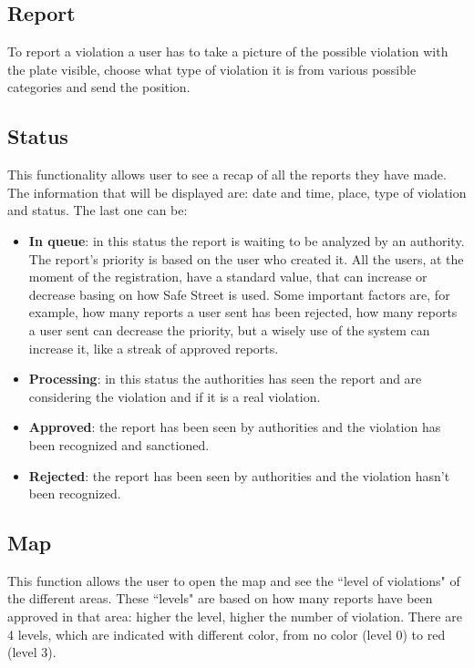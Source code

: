 \documentclass[12pt,a4paper]{report}
\begin{document}
		\subsection{Report}
			To report a violation a user has to take a picture of the possible violation with the plate visible, choose what type of
			violation it is from various possible categories and send the position.
		\subsection{Status}
			This functionality allows user to see a recap of all the reports they have made. The information that will be displayed
			are: date and time, place, type of violation and status. The last one can be:
			\begin{itemize}
				\item \textbf{In queue}:
					in this status the report is waiting to be analyzed by an authority. The report's priority is based on
					the user who created it. All the users, at the moment of the registration, have a standard value, that can increase or decrease basing on	how Safe Street is used. Some important factors are, for example, 
					how many reports a user sent has been rejected, how many reports a user sent can decrease
					the priority, but a wisely use of the system can increase it, like a streak of approved reports.
				\item \textbf{Processing}:
					in this status the authorities has seen the report and are considering the violation and if it is a real
					violation.
				\item \textbf{Approved}:
					the report has been seen by authorities and the violation has been recognized and sanctioned. 
				\item \textbf{Rejected}:
					the report has been seen by authorities and the violation hasn't been recognized.
			\end{itemize}
		\subsection{Map}
			This function allows the user to open the map and see the ``level of violations" of the different areas. These ``levels" are
			based on how many reports have been approved in that area: higher the level, higher the number of violation.
			There are 4 levels, which are indicated with different color, from no color (level 0) to red (level 3).
			
\end{document}
